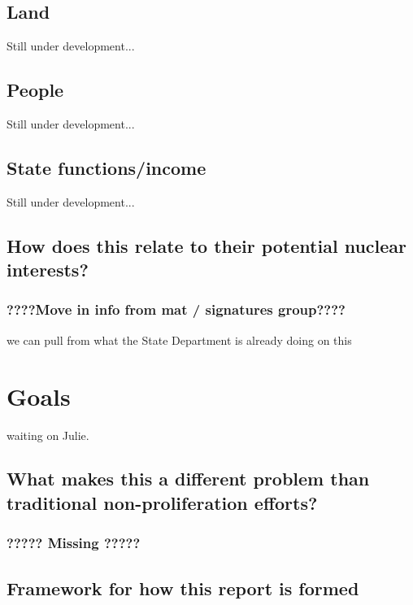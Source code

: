 \documentclass{report}
\begin{document}
\subsection{Land}

Still under development...

\subsection{People}

Still under development...


\subsection{State functions/income}

Still under development...


\subsection{How does this relate to their potential nuclear interests?}
\subsubsection{????Move in info from mat / signatures group????}

we can pull from what the State Department is already doing on this

    
    


\section{Goals}

waiting on Julie.

\subsection{What makes this a different problem than traditional non-proliferation efforts?}

\subsubsection{????? Missing ?????}


\subsection{Framework for how this report is formed}
\end{document}
